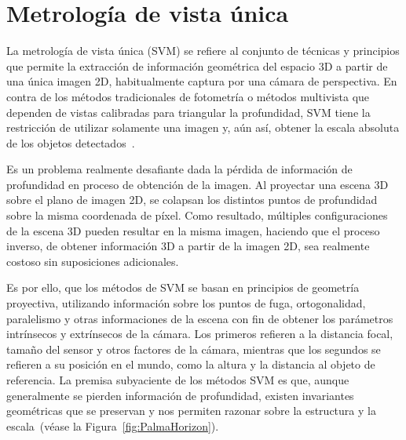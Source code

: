 \section{Metrología de vista única}
La metrología de vista única (SVM) se refiere al conjunto de técnicas y principios que permite la extracción 
de información geométrica del espacio 3D a partir de una única imagen 2D, habitualmente captura por una 
cámara de perspectiva. En contra de los métodos tradicionales de fotometría o métodos multivista que
dependen de vistas calibradas para triangular la profundidad, SVM tiene la restricción de utilizar solamente 
una imagen y, aún así, obtener la escala absoluta de los objetos detectados~\cite{SVMIW}.
\par 
Es un problema realmente desafiante dada la pérdida de información de profundidad en proceso de obtención 
de la imagen. Al proyectar una escena 3D sobre el plano de imagen 2D, se colapsan los distintos puntos de 
profundidad sobre la misma coordenada de píxel. Como resultado, múltiples configuraciones de la escena 3D 
pueden resultar en la misma imagen, haciendo que el proceso inverso, de obtener información 3D a partir de 
la imagen 2D, sea realmente costoso sin suposiciones adicionales.
\par
Es por ello, que los métodos de SVM se basan en principios de geometría proyectiva, utilizando información
sobre los puntos de fuga, ortogonalidad, paralelismo y otras informaciones de la escena con fin de obtener 
los parámetros intrínsecos y extrínsecos de la cámara. Los primeros refieren a la distancia focal, tamaño 
del sensor y otros factores de la cámara, mientras que los segundos se refieren a su posición en el mundo, 
como la altura y la distancia al objeto de referencia. La premisa subyaciente de los métodos SVM es que,
aunque generalmente se pierden información de profundidad, existen invariantes geométricas que se preservan y
nos permiten razonar sobre la estructura y la escala~\cite{VisionBookMIT,Hartley2004}(véase la Figura~\ref{fig:PalmaHorizon}).
\par 
